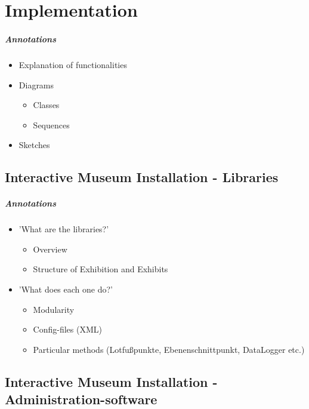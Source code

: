 \chapter{Implementation}
\label{implementation}

\paragraph{Annotations}

\begin{itemize}
	\item Explanation of functionalities
	\item Diagrams
	\begin{itemize}
		\item Classes
		\item Sequences
	\end{itemize}
	\item Sketches
\end{itemize}



\section{Interactive Museum Installation - Libraries}
\label{implementation_libraries}

\paragraph{Annotations}

\begin{itemize}
	\item 'What are the libraries?'
	\begin{itemize}
		\item Overview
		\item Structure of Exhibition and Exhibits
	\end{itemize}
	\item 'What does each one do?'
	\begin{itemize}
		\item Modularity
		\item Config-files (XML)
		\item Particular methods (Lotfußpunkte, Ebenenschnittpunkt, DataLogger etc.)
	\end{itemize}
\end{itemize}



\section{Interactive Museum Installation - Administration-software}
\label{implementation_administration}

